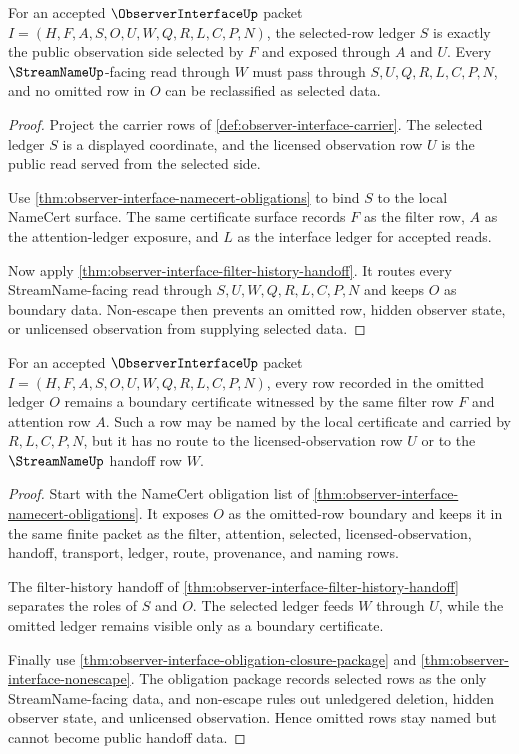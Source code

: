 \begin{theorem}
\label{thm:observer-interface-selected-row-exactness}
For an accepted $\ObserverInterfaceUp$ packet $I=(H,F,A,S,O,U,W,Q,R,L,C,P,N)$, the selected-row ledger $S$ is exactly the public observation side selected by $F$ and exposed through $A$ and $U$. Every $\StreamNameUp$-facing read through $W$ must pass through $S,U,Q,R,L,C,P,N$, and no omitted row in $O$ can be reclassified as selected data.
\end{theorem}
\begin{proof}
Project the carrier rows of \autoref{def:observer-interface-carrier}. The selected ledger $S$ is a displayed coordinate, and the licensed observation row $U$ is the public read served from the selected side.

Use \autoref{thm:observer-interface-namecert-obligations} to bind $S$ to the local NameCert surface. The same certificate surface records $F$ as the filter row, $A$ as the attention-ledger exposure, and $L$ as the interface ledger for accepted reads.

Now apply \autoref{thm:observer-interface-filter-history-handoff}. It routes every StreamName-facing read through $S,U,W,Q,R,L,C,P,N$ and keeps $O$ as boundary data. Non-escape then prevents an omitted row, hidden observer state, or unlicensed observation from supplying selected data.
\end{proof}

\begin{theorem}
\label{thm:observer-interface-omitted-row-boundary}
For an accepted $\ObserverInterfaceUp$ packet $I=(H,F,A,S,O,U,W,Q,R,L,C,P,N)$, every row recorded in the omitted ledger $O$ remains a boundary certificate witnessed by the same filter row $F$ and attention row $A$. Such a row may be named by the local certificate and carried by $R,L,C,P,N$, but it has no route to the licensed-observation row $U$ or to the $\StreamNameUp$ handoff row $W$.
\end{theorem}
\begin{proof}
Start with the NameCert obligation list of \autoref{thm:observer-interface-namecert-obligations}. It exposes $O$ as the omitted-row boundary and keeps it in the same finite packet as the filter, attention, selected, licensed-observation, handoff, transport, ledger, route, provenance, and naming rows.

The filter-history handoff of \autoref{thm:observer-interface-filter-history-handoff} separates the roles of $S$ and $O$. The selected ledger feeds $W$ through $U$, while the omitted ledger remains visible only as a boundary certificate.

Finally use \autoref{thm:observer-interface-obligation-closure-package} and \autoref{thm:observer-interface-nonescape}. The obligation package records selected rows as the only StreamName-facing data, and non-escape rules out unledgered deletion, hidden observer state, and unlicensed observation. Hence omitted rows stay named but cannot become public handoff data.
\end{proof}

